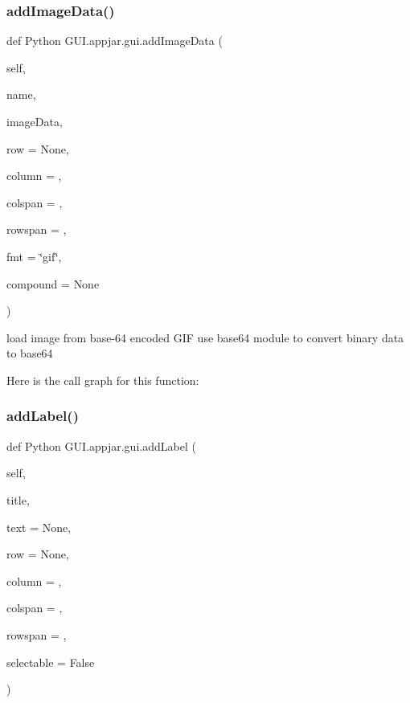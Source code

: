 \subsubsection{\texorpdfstring{add\+Image\+Data()}{addImageData()}}
{\footnotesize\ttfamily def Python G\+U\+I.\+appjar.\+gui.\+add\+Image\+Data (\begin{DoxyParamCaption}\item[{}]{self,  }\item[{}]{name,  }\item[{}]{image\+Data,  }\item[{}]{row = {\ttfamily None},  }\item[{}]{column = {},  }\item[{}]{colspan = {},  }\item[{}]{rowspan = {},  }\item[{}]{fmt = {\ttfamily \char`\"{}gif\char`\"{}},  }\item[{}]{compound = {\ttfamily None} }\end{DoxyParamCaption})}

\begin{DoxyVerb}load image from base-64 encoded GIF
    use base64 module to convert binary data to base64 \end{DoxyVerb}
 Here is the call graph for this function\+:
\mbox{\label{class_python_01_g_u_i_1_1appjar_1_1gui_a4e47ba29cb48ce5edee19d0f160dea44}} 
\subsubsection{\texorpdfstring{add\+Label()}{addLabel()}}
{\footnotesize\ttfamily def Python G\+U\+I.\+appjar.\+gui.\+add\+Label (\begin{DoxyParamCaption}\item[{}]{self,  }\item[{}]{title,  }\item[{}]{text = {\ttfamily None},  }\item[{}]{row = {\ttfamily None},  }\item[{}]{column = {},  }\item[{}]{colspan = {},  }\item[{}]{rowspan = {},  }\item[{}]{selectable = {\ttfamily False} }\end{DoxyParamCaption})}

